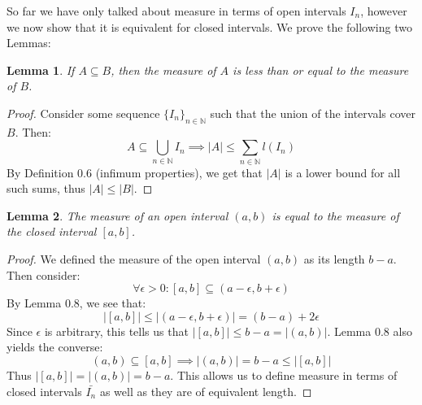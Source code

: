 \documentclass[10pt,letterpaper]{article} %
\newtheorem{lem}{Lemma}[section]
\begin{document}
So far we have only talked about measure in terms of open intervals $I_n$, however we now show that it is equivalent for closed intervals. We prove the following two Lemmas:
\begin{lem}
If $A \subseteq B$, then the measure of $A$ is less than or equal to the measure of $B$.
\end{lem}
\begin{proof}
Consider some sequence $\{I_n\}_{n \in \mathbb{N}}$ such that the union of the intervals cover $B$. Then:
\begin{equation*}
  A \subseteq \bigcup_{n \in \mathbb{N}}I_n \implies |A| \leqslant \sum_{n \in \mathbb{N}}l(I_n)
\end{equation*}
By Definition 0.6 (infimum properties), we get that $|A|$ is a lower bound for all such sums, thus $|A| \leqslant |B|$.
\end{proof}
\begin{lem}
The measure of an open interval $(a, b)$ is equal to the measure of the closed interval $[a, b]$.
\end{lem}
\begin{proof}
We defined the measure of the open interval $(a, b)$ as its length $b-a$. Then consider:
\begin{equation*}
  \forall \epsilon > 0: [a, b] \subseteq (a - \epsilon, b + \epsilon)
\end{equation*}
By Lemma 0.8, we see that:
\begin{equation*}
  |[a, b]| \leqslant |(a- \epsilon, b+\epsilon)| = (b-a) + 2\epsilon
\end{equation*}
Since $\epsilon$ is arbitrary, this tells us that $|[a, b]| \leqslant b-a = |(a, b)|$. Lemma 0.8 also yields the converse:
\begin{equation*}
  (a, b) \subseteq [a, b] \implies |(a, b)| = b-a \leqslant |[a, b]|
\end{equation*}
Thus $|[a, b]| = |(a, b)| = b-a$. This allows us to define measure in terms of closed intervals $\bar{I_n}$ as well as they are of equivalent length.
\end{proof}
\end{document}
